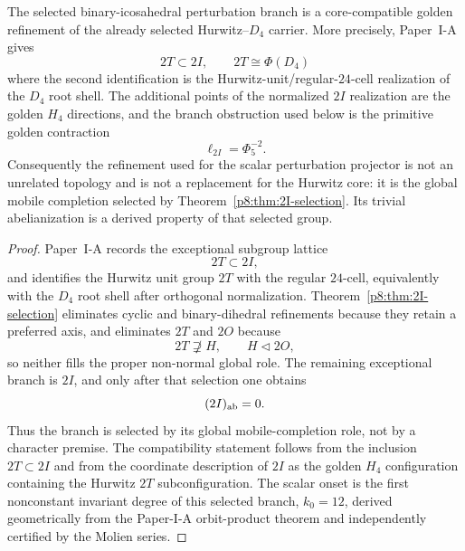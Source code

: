\documentclass[12pt,a4paper]{article}
\begin{document}
\begin{proposition}
\label{p8:prop:d4-core-2I-compatibility}
The selected binary-icosahedral perturbation branch is a core-compatible golden refinement of the already selected Hurwitz--\(D_4\) carrier.  More precisely, Paper~I-A gives
\[
    2T\subset 2I,
    \qquad
    2T\cong \Phi(D_4)
\]
where the second identification is the Hurwitz-unit/regular-\(24\)-cell realization of the \(D_4\) root shell.  The additional points of the normalized \(2I\) realization are the golden \(H_4\) directions, and the branch obstruction used below is the primitive golden contraction
\[
    \ell_{2I}=\Phi_5^{-2}.
\]
Consequently the refinement used for the scalar perturbation projector is not
an unrelated topology and is not a replacement for the Hurwitz core: it is
the global mobile completion selected by
Theorem~\ref{p8:thm:2I-selection}.  Its trivial abelianization is a derived
property of that selected group.
\end{proposition}

\begin{proof}
Paper~I-A records the exceptional subgroup lattice
\[
    2T\subset 2I,
\]
and identifies the Hurwitz unit group \(2T\) with the regular \(24\)-cell, equivalently with the \(D_4\) root shell after orthogonal normalization.  Theorem~\ref{p8:thm:2I-selection} eliminates cyclic and binary-dihedral refinements because they retain a preferred axis, and eliminates \(2T\) and \(2O\) because
\[
    2T\not\supsetneq H,
    \qquad
    H\triangleleft 2O,
\]
so neither fills the proper non-normal global role.  The remaining
exceptional branch is \(2I\), and only after that selection one obtains
\[
    (2I)_{\rm ab}=0.
\]
Thus the branch is selected by its global mobile-completion role, not by a
character premise.  The compatibility statement follows from the inclusion
\(2T\subset2I\) and from the coordinate description of \(2I\) as the golden
\(H_4\) configuration containing the Hurwitz \(2T\) subconfiguration.  The
scalar onset is the first nonconstant invariant degree of this selected
branch, \(k_0=12\), derived geometrically from the Paper-I-A orbit-product
theorem and independently certified by the Molien series.
\end{proof}
\end{document}
